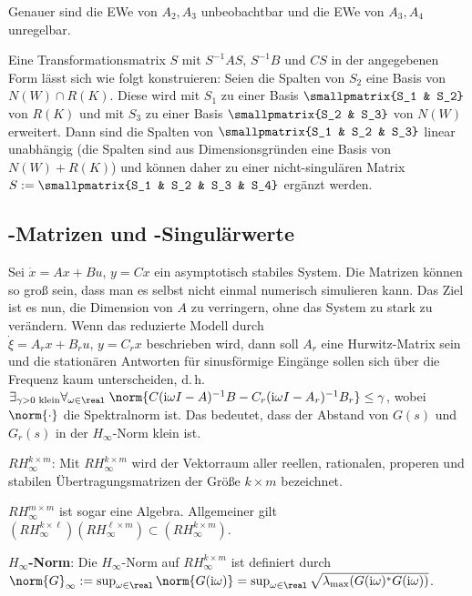 Genauer sind die EWe von $A_2, A_3$ unbeobachtbar und die EWe von
$A_3, A_4$ unregelbar.

Eine Transformationsmatrix $S$ mit $S^{-1} AS$, $S^{-1} B$ und $CS$ in der angegebenen Form lässt
sich wie folgt konstruieren:
Seien die Spalten von $S_2$ eine Basis von $N(W) \cap R(K)$.
Diese wird mit $S_1$ zu einer Basis $\smallpmatrix{S_1 & S_2}$ von $R(K)$ und
mit $S_3$ zu einer Basis $\smallpmatrix{S_2 & S_3}$ von $N(W)$ erweitert.
Dann sind die Spalten von $\smallpmatrix{S_1 & S_2 & S_3}$ linear unabhängig
(die Spalten sind aus Dimensionsgründen eine Basis von $N(W) + R(K)$) und können daher zu einer
nicht-singulären Matrix $S := \smallpmatrix{S_1 & S_2 & S_3 & S_4}$ ergänzt werden.

\pagebreak

\subsection{%
    -Matrizen und -Singulärwerte%
}

Sei $\dot{x} = Ax + Bu$, $y = Cx$ ein asymptotisch stabiles System.
Die Matrizen können so groß sein, dass man es selbst nicht einmal numerisch simulieren kann.
Das Ziel ist es nun, die Dimension von $A$ zu verringern, ohne das System zu stark zu verändern.
Wenn das reduzierte Modell durch\\$\dot{\xi} = A_r x + B_r u$, $y = C_r x$ beschrieben wird,
dann soll $A_r$ eine Hurwitz-Matrix sein und die stationären Antworten für
sinusförmige Eingänge sollen sich über die Frequenz kaum unterscheiden, d.\,h.
$\exists_{\gamma > 0 \text{ klein}} \forall_{\omega \in \real}\;
\norm{C (\iu \omega I - A)^{-1} B - C_r (\iu \omega I - A_r)^{-1} B_r} \le \gamma$,
wobei $\norm{\cdot}$ die Spektralnorm ist.
Das bedeutet, dass der Abstand von $G(s)$ und $G_r(s)$ in der $H_\infty$-Norm klein ist.

\textbf{$RH_\infty^{k \times m}$}:
Mit $RH_\infty^{k \times m}$ wird der Vektorraum aller reellen, rationalen, properen und stabilen
Übertragungsmatrizen der Größe $k \times m$ bezeichnet.

$RH_\infty^{m \times m}$ ist sogar eine Algebra.
Allgemeiner gilt $(RH_\infty^{k \times \ell}) (RH_\infty^{\ell \times m}) \subset
(RH_\infty^{k \times m})$.

\textbf{$H_\infty$-Norm}:
Die $H_\infty$-Norm auf $RH_\infty^{k \times m}$ ist definiert durch\\
$\norm{G}_\infty := \sup_{\omega \in \real} \norm{G(\iu\omega)}
= \sup_{\omega \in \real} \sqrt{\lambda_{\max}(G(\iu\omega)^\ast G(\iu\omega))}$.


